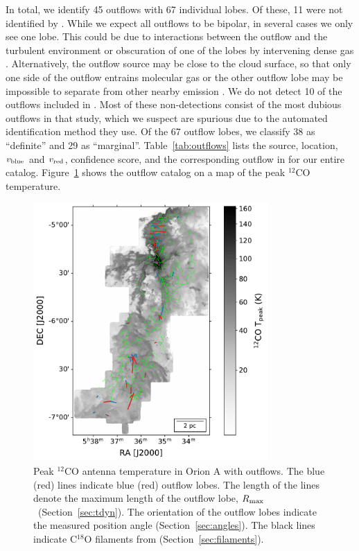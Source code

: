 \documentclass[twocolumn]{aastex63}
\newcommand{\co}[1][]{\ensuremath{^{#1}}CO}
\begin{document}
In total, we identify 45 outflows with 67 individual lobes. Of these, 11 were not identified by \citet{Tanabe19}. While we expect all outflows to be bipolar, in several cases we only see one lobe. This could be due to interactions between the outflow and the turbulent environment or obscuration of one of the lobes by intervening dense gas \citep{Offner11}. Alternatively, the outflow source may be close to the cloud surface, so that only one side of the outflow entrains molecular gas \citep[e.g.][]{Chernin95} or the other outflow lobe may be impossible to separate from other nearby emission \citep{Arce01a}. We do not detect 10 of the outflows included in \citet{Tanabe19}. Most of these non-detections consist of the most dubious outflows in that study, which we suspect are spurious due to the automated identification method they use. Of the 67 outflow lobes, we classify 38 as ``definite'' and 29 as ``marginal''. Table~\ref{tab:outflows} lists the source, location, $v_{\rm blue}$ and $v_{\rm red}$, confidence score, and the corresponding outflow in \citet{Tanabe19} for our entire catalog. Figure~\ref{fig:overview} shows the outflow catalog on a map of the peak \co[12]{} temperature.

\begin{figure}
\centering
\includegraphics[width=0.8\textwidth]{overview.pdf}
\caption{Peak \co[12]{} antenna temperature in Orion A with outflows. The blue (red) lines indicate blue (red) outflow lobes. The length of the lines denote the maximum length of the outflow lobe, $R_{\rm max}$~(Section~\ref{sec:tdyn}). The orientation of the outflow lobes indicate the measured position angle (Section~\ref{sec:angles}). The black lines indicate C$^{18}$O filaments from \citet{Suri19} (Section~\ref{sec:filaments}). \label{fig:overview}}
\end{figure}
\end{document}
